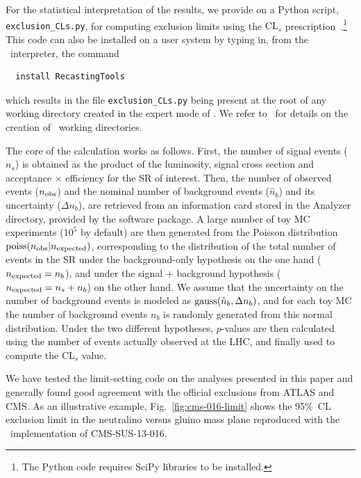 For the statistical interpretation of the results, we provide on \cite{ma5wiki} a {\sc Python} script, 
{\tt exclusion\_CLs.py}, for computing exclusion limits using the $\mathrm{CL}_s$ prescription~\cite{bib-cls}.\footnote{The
{\sc Python} code requires {\sc SciPy} libraries to be installed.}
This code can also be installed on a user system by typing in, from the \ma\ interpreter, the command
\begin{verbatim}
  install RecastingTools
\end{verbatim}
which results in the file \texttt{exclusion\_CLs.py} being present at the
root of any working directory created in the expert mode of \ma. 
We refer to~\cite{Conte:2014zja,ma5wiki} for details on the creation of \ma\ working directories.


The core of the calculation works as follows. First, the number of signal events ($n_s$) is obtained as the
product of the luminosity, signal cross section and acceptance $\times$ efficiency for the SR of interest.
Then, the number of observed events ($n_{\rm obs}$) and the nominal number of background
events ($\hat n_b$) and its uncertainty ($\Delta n_b$), are retrieved from an information card stored in the Analyzer directory, provided by the software package.
A large number of toy MC experiments ($10^5$ by default) are then generated from the Poisson distribution
${\rm poiss}(n_{\rm obs} | n_{\rm expected})$, 
corresponding to the distribution of the total number of events in the SR under the
background-only hypothesis on the one hand ($n_{\rm expected} = n_b$), and under the
signal $+$ background hypothesis ($n_{\rm expected} = n_s + n_b$) on the other hand.
We assume that the uncertainty on the number of background events is modeled as ${\rm gauss}(\hat n_b, \Delta n_b)$,
and for each toy MC the number of background events $n_b$ is randomly generated from this normal distribution.
Under the two different hypotheses, $p$-values are then calculated using the number of events actually observed at the LHC, and finally used to compute the CL$_s$ value.

We have tested the limit-setting code on the analyses presented in this paper and generally found good agreement with the official exclusions from ATLAS and CMS.
As an illustrative example, Fig.~\ref{fig:cms-016-limit} shows the 95\%~CL exclusion limit in the neutralino versus gluino mass plane reproduced with the \ma\ implementation \cite{MA5-CMS-SUS-13-016}  of CMS-SUS-13-016.  

